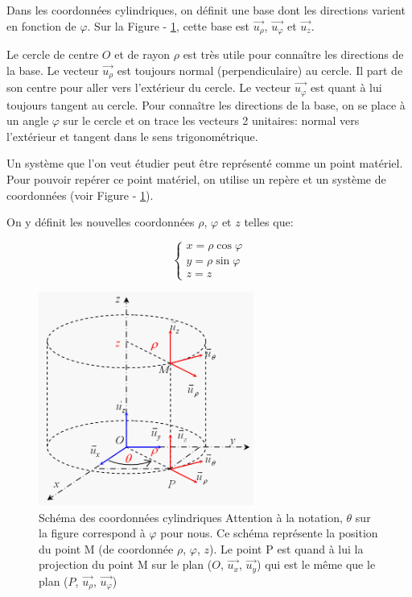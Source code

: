 \documentclass[14pt]{article}
\begin{document}
Dans les coordonnées cylindriques, on définit une base dont les directions varient en fonction de $\varphi$. Sur la Figure - \ref{fig:cylcoords}, cette base est $\vec{u_\rho}$, $\vec{u_{\varphi}}$ et $\vec{u_z}$.

Le cercle de centre $O$ et de rayon $\rho$ est très utile pour connaître les directions de la base.  
Le vecteur $\vec{u_{\rho}}$ est toujours normal (perpendiculaire) au cercle. Il part de son centre pour aller vers l'extérieur du cercle.
Le vecteur $\vec{u_{\varphi}}$ est quant à lui toujours tangent au cercle.
Pour connaître les directions de la base, on se place à un angle $\varphi$ sur le cercle et on trace les vecteurs 2 unitaires: normal vers l’extérieur et tangent dans le sens trigonométrique.

Un système que l'on veut étudier peut être représenté comme un point matériel.
Pour pouvoir repérer ce point matériel, on utilise un repère et un système de coordonnées (voir Figure - \ref{fig:cylcoords}).

On y définit les nouvelles coordonnées $\rho$, $\varphi$ et $z$ telles que:

\begin{equation} \label{eq:1.1}
    \begin{cases}
    x = \rho \cos{\varphi} \\
    y = \rho \sin{\varphi} \\
    z = z
    \end{cases}
    \tag{1.1.1}
\end{equation} 

\begin{figure}[ht]
\includegraphics[width=200pt,height=200pt]{cylinder_coords.png}
\centering
\caption{
Schéma des coordonnées cylindriques\cite{henry} 
Attention à la notation, $\theta$ sur la figure correspond à $\varphi$ pour nous.
Ce schéma représente la position du point M (de coordonnée $\rho$, $\varphi$, $z$). Le point P est quand à lui la projection du point M sur le plan ($O$, $\vec{u_x}$, $\vec{u_y}$) qui est le même que le plan ($P$, $\vec{u_{\rho}}$, $\vec{u_{\varphi}}$)
}
\label{fig:cylcoords}
\end{figure}
\end{document}
